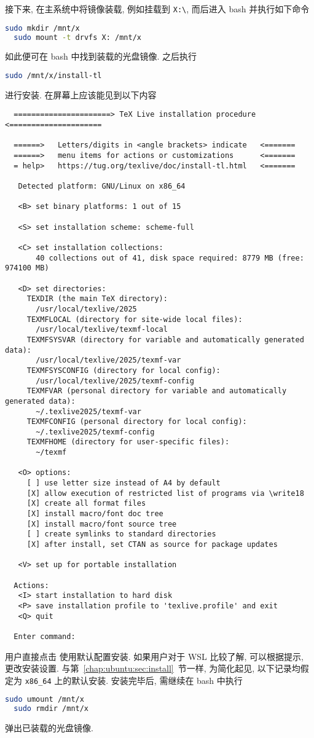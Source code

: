 接下来, 在主系统中将镜像装载,
例如挂载到 \texttt{X:\textbackslash},
而后进入 \textsf{bash} 并执行如下命令
\begin{lstlisting}[language = bash]
  sudo mkdir /mnt/x
  sudo mount -t drvfs X: /mnt/x
\end{lstlisting}
如此便可在 \textsf{bash} 中找到装载的光盘镜像.
之后执行
\begin{lstlisting}[language = bash]
  sudo /mnt/x/install-tl
\end{lstlisting}
进行安装.
在屏幕上应该能见到以下内容
\begin{lstlisting}
  ======================> TeX Live installation procedure <=====================

  ======>   Letters/digits in <angle brackets> indicate   <=======
  ======>   menu items for actions or customizations      <=======
  = help>   https://tug.org/texlive/doc/install-tl.html   <=======
  
   Detected platform: GNU/Linux on x86_64
  
   <B> set binary platforms: 1 out of 15
  
   <S> set installation scheme: scheme-full
  
   <C> set installation collections:
       40 collections out of 41, disk space required: 8779 MB (free: 974100 MB)
  
   <D> set directories:
     TEXDIR (the main TeX directory):
       /usr/local/texlive/2025
     TEXMFLOCAL (directory for site-wide local files):
       /usr/local/texlive/texmf-local
     TEXMFSYSVAR (directory for variable and automatically generated data):
       /usr/local/texlive/2025/texmf-var
     TEXMFSYSCONFIG (directory for local config):
       /usr/local/texlive/2025/texmf-config
     TEXMFVAR (personal directory for variable and automatically generated data):
       ~/.texlive2025/texmf-var
     TEXMFCONFIG (personal directory for local config):
       ~/.texlive2025/texmf-config
     TEXMFHOME (directory for user-specific files):
       ~/texmf
  
   <O> options:
     [ ] use letter size instead of A4 by default
     [X] allow execution of restricted list of programs via \write18
     [X] create all format files
     [X] install macro/font doc tree
     [X] install macro/font source tree
     [ ] create symlinks to standard directories
     [X] after install, set CTAN as source for package updates
  
   <V> set up for portable installation
  
  Actions:
   <I> start installation to hard disk
   <P> save installation profile to 'texlive.profile' and exit
   <Q> quit
  
  Enter command:
\end{lstlisting}
用户直接点击  使用默认配置安装.
如果用户对于 WSL 比较了解, 可以根据提示, 更改安装设置.
与第~\ref{chap:ubuntu:sec:install}~节一样,
为简化起见,
以下记录均假定为 \texttt{x86\_64} 上的默认安装.
安装完毕后, 需继续在 \textsf{bash} 中执行
\begin{lstlisting}[language = bash]
  sudo umount /mnt/x
  sudo rmdir /mnt/x
\end{lstlisting}
弹出已装载的光盘镜像.

